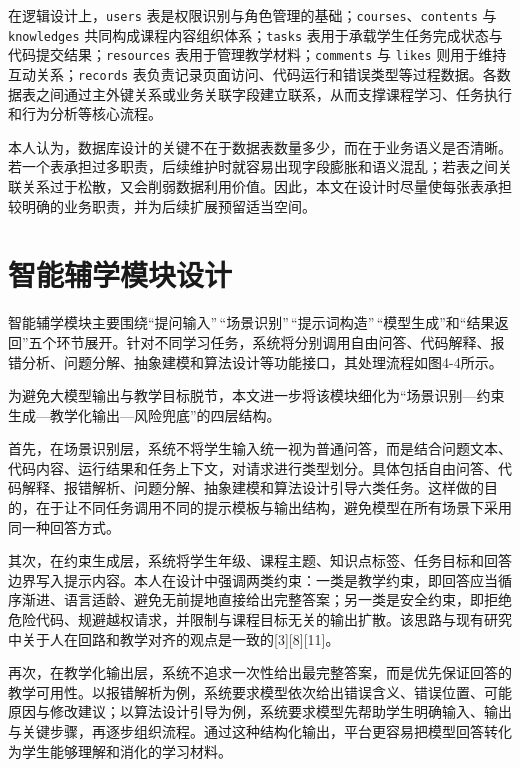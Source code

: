 在逻辑设计上，\texttt{users} 表是权限识别与角色管理的基础；\texttt{courses}、\texttt{contents} 与 \texttt{knowledges} 共同构成课程内容组织体系；\texttt{tasks} 表用于承载学生任务完成状态与代码提交结果；\texttt{resources} 表用于管理教学材料；\texttt{comments} 与 \texttt{likes} 则用于维持互动关系；\texttt{records} 表负责记录页面访问、代码运行和错误类型等过程数据。各数据表之间通过主外键关系或业务关联字段建立联系，从而支撑课程学习、任务执行和行为分析等核心流程。

本人认为，数据库设计的关键不在于数据表数量多少，而在于业务语义是否清晰。若一个表承担过多职责，后续维护时就容易出现字段膨胀和语义混乱；若表之间关联关系过于松散，又会削弱数据利用价值。因此，本文在设计时尽量使每张表承担较明确的业务职责，并为后续扩展预留适当空间。

\section{智能辅学模块设计}\label{ux667aux80fdux8f85ux5b66ux6a21ux5757ux8bbeux8ba1}

智能辅学模块主要围绕``提问输入''\,``场景识别''\,``提示词构造''\,``模型生成''和``结果返回''五个环节展开。针对不同学习任务，系统将分别调用自由问答、代码解释、报错分析、问题分解、抽象建模和算法设计等功能接口，其处理流程如图4-4所示。

\tikzAiFlowFigure

为避免大模型输出与教学目标脱节，本文进一步将该模块细化为``场景识别---约束生成---教学化输出---风险兜底''的四层结构。

首先，在场景识别层，系统不将学生输入统一视为普通问答，而是结合问题文本、代码内容、运行结果和任务上下文，对请求进行类型划分。具体包括自由问答、代码解释、报错解析、问题分解、抽象建模和算法设计引导六类任务。这样做的目的，在于让不同任务调用不同的提示模板与输出结构，避免模型在所有场景下采用同一种回答方式。

其次，在约束生成层，系统将学生年级、课程主题、知识点标签、任务目标和回答边界写入提示内容。本人在设计中强调两类约束：一类是教学约束，即回答应当循序渐进、语言适龄、避免无前提地直接给出完整答案；另一类是安全约束，即拒绝危险代码、规避越权请求，并限制与课程目标无关的输出扩散。该思路与现有研究中关于人在回路和教学对齐的观点是一致的{[}3{]}{[}8{]}{[}11{]}。

再次，在教学化输出层，系统不追求一次性给出最完整答案，而是优先保证回答的教学可用性。以报错解析为例，系统要求模型依次给出错误含义、错误位置、可能原因与修改建议；以算法设计引导为例，系统要求模型先帮助学生明确输入、输出与关键步骤，再逐步组织流程。通过这种结构化输出，平台更容易把模型回答转化为学生能够理解和消化的学习材料。

